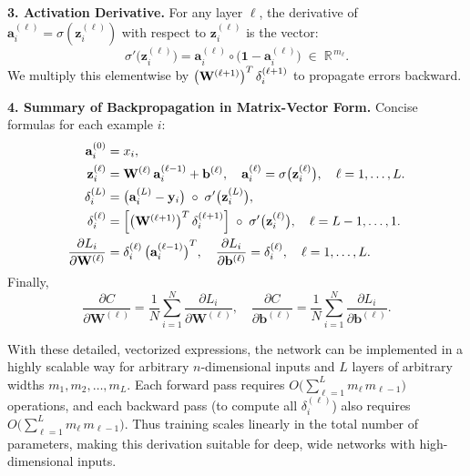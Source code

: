 \documentclass{article}
\begin{document}
\medskip
\noindent \textbf{3. Activation Derivative.}  
For any layer \(\ell\), the derivative of \(\mathbf{a}_{i}^{(\ell)} = \sigma(\mathbf{z}_{i}^{(\ell)})\) with respect to \(\mathbf{z}_{i}^{(\ell)}\) is the vector:
\[
    \sigma'\bigl(\mathbf{z}_{i}^{(\ell)}\bigr) 
    = \mathbf{a}_{i}^{(\ell)} \circ \bigl(\mathbf{1} - \mathbf{a}_{i}^{(\ell)}\bigr)
    \;\in\;\mathbb{R}^{\,m_{\ell}}.
\]
We multiply this elementwise by \(\bigl{(\mathbf{W}^{(\ell+1)}\bigr)}^{T}\,\delta_{i}^{(\ell+1)}\) to propagate errors backward.

\medskip
\noindent \textbf{4. Summary of Backpropagation in Matrix-Vector Form.}  
Concise formulas for each example \(i\):
\[
\begin{aligned}
    \mathbf{a}_{i}^{(0)} &= x_{i}, \\
    \mathbf{z}_{i}^{(\ell)} &= \mathbf{W}^{(\ell)}\,\mathbf{a}_{i}^{(\ell-1)} + \mathbf{b}^{(\ell)}, 
    \quad
    \mathbf{a}_{i}^{(\ell)} = \sigma\bigl(\mathbf{z}_{i}^{(\ell)}\bigr),
    \quad \ell = 1,\ldots,L.\\
    \delta_{i}^{(L)} &= \bigl(\mathbf{a}_{i}^{(L)} - \mathbf{y}_{i}\bigr)\;\circ\;\sigma'\bigl(\mathbf{z}_{i}^{(L)}\bigr), \\
    \delta_{i}^{(\ell)} &= \Bigl[\bigl{(\mathbf{W}^{(\ell+1)}\bigr)}^{T}\,\delta_{i}^{(\ell+1)}\Bigr]
      \;\circ\;\sigma'\bigl(\mathbf{z}_{i}^{(\ell)}\bigr),
    \quad \ell = L-1,\dots,1.\\
    \frac{\partial L_{i}}{\partial \mathbf{W}^{(\ell)}} 
    &= \delta_{i}^{(\ell)}\,{\bigl(\mathbf{a}_{i}^{(\ell-1)}\bigr)}^{T}, 
    \quad
    \frac{\partial L_{i}}{\partial \mathbf{b}^{(\ell)}} 
    = \delta_{i}^{(\ell)}, 
    \quad \ell = 1,\dots,L.
\end{aligned}
\]
Finally,
\[
    \frac{\partial C}{\partial \mathbf{W}^{(\ell)}} 
    = \frac{1}{N}\sum_{i=1}^{N} \frac{\partial L_{i}}{\partial \mathbf{W}^{(\ell)}}, 
    \quad
    \frac{\partial C}{\partial \mathbf{b}^{(\ell)}} 
    = \frac{1}{N}\sum_{i=1}^{N} \frac{\partial L_{i}}{\partial \mathbf{b}^{(\ell)}}.
\]



\vspace{1em}
\noindent With these detailed, vectorized expressions, the network can be implemented in a highly scalable way for arbitrary \(n\)-dimensional inputs and \(L\) layers of arbitrary widths \(m_{1},m_{2},\dots,m_{L}\).  Each forward pass requires \(O\bigl(\sum_{\ell=1}^{L} m_{\ell} \,m_{\ell-1}\bigr)\) operations, and each backward pass (to compute all \(\delta_{i}^{(\ell)}\)) also requires \(O\bigl(\sum_{\ell=1}^{L} m_{\ell} \,m_{\ell-1}\bigr)\).  Thus training scales linearly in the total number of parameters, making this derivation suitable for deep, wide networks with high-dimensional inputs.
\end{document}
